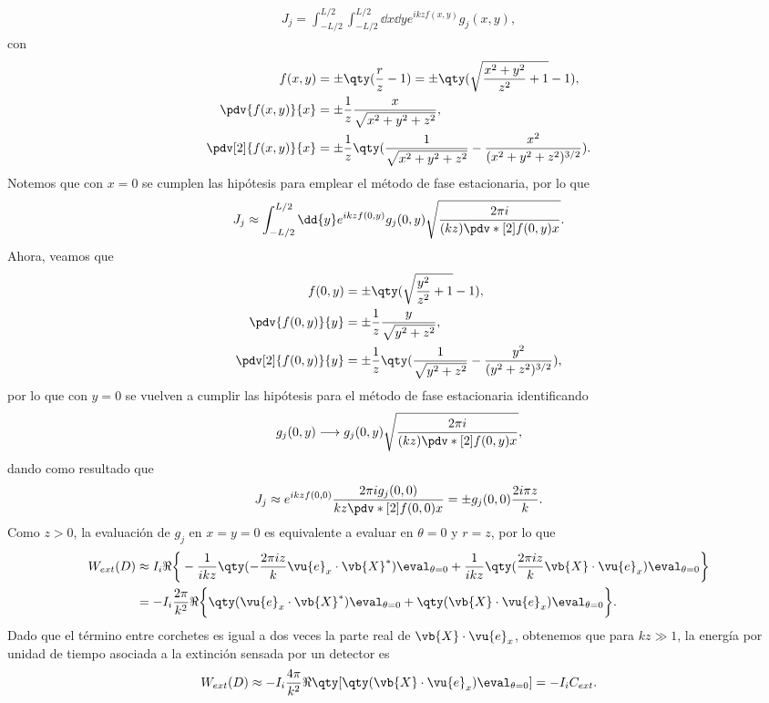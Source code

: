 \begin{enumerate}[label=\textbf{Ejercicio \thechapter.\arabic*},resume]
%
\begin{align*}
 J_j = \int_{-L/2}^{L/2}\int_{-L/2}^{L/2}\dd{x}\dd{y}e^{ikzf(x,y)}g_j(x,y),
\end{align*}
%
con 
%
\begin{align*}
f(x,y) &= \pm\qty(\frac{r}{z}-1) = \pm\qty(\sqrt{\frac{x^2+y^2}{z^2}+1}-1),\\
\pdv{f(x,y)}{x} &= \pm\frac{ 1}{z}\frac{ x}{\sqrt{x^2+y^2+z^2}},\\
\pdv[2]{f(x,y)}{x} &= \pm\frac{ 1}{z}\qty(\frac{1}{\sqrt{x^2+y^2+z^2}} - \frac{x^2}{(x^2+y^2+z^2)^{3/2}}).
\end{align*}
%
Notemos que con $x = 0$ se cumplen las hipótesis para emplear el método de fase estacionaria, por lo que
%
\begin{align*}
 J_j \approx \int_{-L/2}^{L/2}\dd{y}e^{ikzf(0,y)}g_j(0,y)\sqrt{\frac{2\pi i}{(kz)\pdv*[2]{f(0,y)}{x}}}.
\end{align*}
%
Ahora, veamos que
\begin{align*}
f(0,y) &=\pm\qty(\sqrt{\frac{y^2}{z^2}+1}-1),\\
\pdv{f(0,y)}{y} &= \pm \frac{ 1}{z}\frac{ y}{\sqrt{y^2+z^2}},\\
\pdv[2]{f(0,y)}{y} &= \pm\frac{ 1}{z}\qty(\frac{1}{\sqrt{y^2+z^2}} - \frac{y^2}{(y^2+z^2)^{3/2}}),
\end{align*}
por lo que con $y=0$ se vuelven a cumplir las hipótesis para el método de fase estacionaria identificando
%
\begin{align*}
g_j(0,y) \longrightarrow g_j(0,y)\sqrt{\frac{2\pi i}{(kz)\pdv*[2]{f(0,y)}{x}}},
\end{align*}
%
dando como resultado que
%
\begin{align*}
 J_j \approx e^{ikzf(0,0)} \frac{2\pi i g_j(0,0)}{kz\pdv*[2]{f(0,0)}{x}} = \pm g_j(0,0) \frac{2i\pi z}{k} .
\end{align*}
%
Como $z>0$, la evaluación de $g_j$ en $x=y=0$ es equivalente a evaluar en $\theta = 0$ y $r = z$, por lo que 
%
\begin{align*}
W_{ext}(D) &\approx I_i\Re\bigg\{
	-\frac{1}{ikz}\qty(-\frac{2\pi i z}{k}\vu{e}_x\cdot\vb{X}^*)\eval_{\theta = 0}
	+ \frac{1}{ikz}\qty(\frac{2\pi i z}{k}\vb{X}\cdot\vu{e}_x)\eval_{\theta = 0}
\bigg\}\\
	&= -I_i \frac{2\pi}{k^2}\Re\bigg\{
	\qty(\vu{e}_x\cdot\vb{X}^*)\eval_{\theta = 0} + \qty(\vb{X}\cdot\vu{e}_x)\eval_{\theta = 0}
\bigg\}.
\end{align*}
%
Dado que el término entre corchetes es igual a dos veces la parte real de $\vb{X}\cdot\vu{e}_x$, obtenemos 	que para $kz\gg 1$, la energía por unidad de tiempo asociada a la extinción sensada por un detector es
%
\begin{align*}
W_{ext}(D) \approx - I_i \frac{4\pi}{k^2}\Re\qty[ \qty(\vb{X}\cdot\vu{e}_x)\eval_{\theta = 0}] = -I_iC_{ext}.
\end{align*}
%


\end{enumerate}
